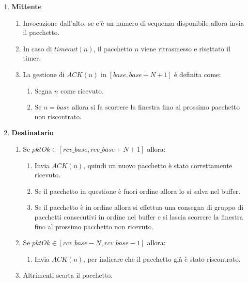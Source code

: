 \documentclass{article}
\begin{document}
\begin{enumerate}
    \item \textbf{Mittente}
    \begin{enumerate}
        \item Invocazione dall'alto, se c'è un numero di sequenza disponibile allora invia il pacchetto.
        \item In caso di $timeout(n)$, il pacchetto $n$ viene ritrasmesso e risettato il timer.
        \item La gestione di $ACK(n)$ in $[base, base+N+1]$ è definita come:
        \begin{enumerate}
            \item Segna $n$ come ricevuto.
            \item Se $n = base$ allora si fa scorrere la finestra fino al prossimo pacchetto non riscontrato.
        \end{enumerate}
    \end{enumerate} 
    \item \textbf{Destinatario}
    \begin{enumerate}
        \item Se $pktOk \in [rcv\_base, rcv\_base+N+1]$ allora:
        \begin{enumerate}
            \item Invia $ACK(n)$, quindi un nuovo pacchetto è stato correttamente ricevuto.
            \item Se il pacchetto in questione è fuori ordine allora lo si salva nel buffer.
            \item Se il pacchetto è in ordine allora si effettua una consegna di gruppo di pacchetti consecutivi in ordine nel buffer e si lascia scorrere la
            finestra fino al prossimo pacchetto non ricevuto.
        \end{enumerate}
        \item Se $pktOk \in [rcv\_base-N, rcv\_base-1]$ allora:
        \begin{enumerate}
            \item Invia $ACK(n)$, per indicare che il pacchetto già è stato riscontrato.
        \end{enumerate}
        \item Altrimenti scarta il pacchetto.
    \end{enumerate}
\end{enumerate}
\end{document}
